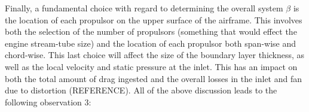 					
					Finally, a fundamental choice with regard to determining the overall system $\beta$ is the location of each propulsor on the upper surface of the airframe.  This involves both the selection of the number of propulsors (something that would effect the engine stream-tube size) and the location of each propulsor both span-wise and chord-wise.  This last choice will affect the size of the boundary layer thickness, as well as the local velocity and static pressure at the inlet.  This has an impact on both the total amount of drag ingested and the overall losses in the inlet and fan due to distortion (REFERENCE).  All of the above discussion leads to the following observation 3:
					
					\vspace{1pt}
					\vspace{5mm}
				
